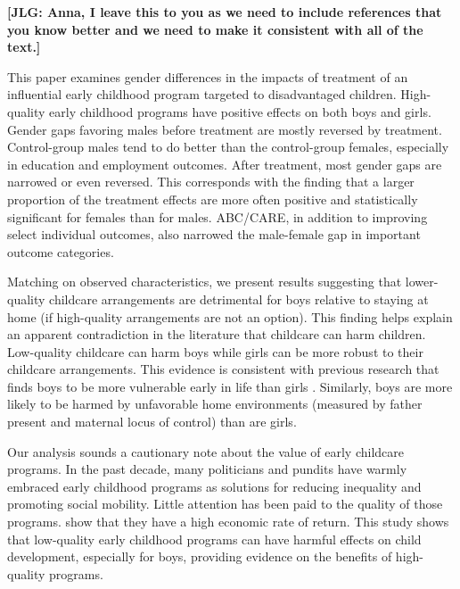 
\noindent \textbf{[JLG: Anna, I leave this to you as we need to include references that you know better and we need to make it consistent with all of the text.]}

This paper examines gender differences in the impacts of treatment of an influential early childhood program targeted to disadvantaged children. High-quality early childhood programs have positive effects on both boys and girls. Gender gaps favoring males before treatment are mostly reversed by treatment. Control-group males tend to do better than the control-group females, especially in education and employment outcomes. After treatment, most gender gaps are narrowed or even reversed. This corresponds with the finding that a larger proportion of the treatment effects are more often positive and statistically significant for females than for males. ABC/CARE, in addition to improving select individual outcomes, also narrowed the male-female gap in important outcome categories.

Matching on observed characteristics, we present results suggesting that lower-quality childcare arrangements are detrimental for boys relative to staying at home (if high-quality arrangements are not an option). This finding helps explain an apparent contradiction in the literature \citep{Baker_Gruber_etal_2008_JPE,Baker_Gruber_Milligan_2015_Noncog_Defects,Kottelenberg_Lehrer_2014_Gender-Effects} that childcare can harm children. Low-quality childcare can harm boys while girls can be more robust to their childcare arrangements. This evidence is consistent with previous research that finds boys to be more vulnerable early in life than girls \citep{Golding_Fitzgerald_2017_IMHJ}. Similarly, boys are more likely to be harmed by unfavorable home environments (measured by father present and maternal locus of control) than are girls.

Our analysis sounds a cautionary note about the value of early childcare programs. In the past decade, many politicians and pundits have warmly embraced early childhood programs as solutions for reducing inequality and promoting social mobility. Little attention has been paid to the quality of those programs. \cite{Garcia_Heckman_Leaf_etal_2017_Comp_CBA_Unpublished} show that they have a high economic rate of return. This study shows that low-quality early childhood programs can have harmful effects on child development, especially for boys, providing evidence on the benefits of high-quality programs.

